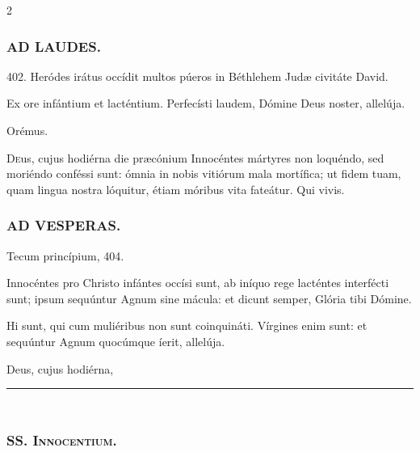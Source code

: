 \documentclass[9pt,twoside]{extarticle}
\begin{document}
\begin{multicols}{2}
\subsubsection*{\center \textsc{AD LAUDES.}}
\begin{tightlist}{}
\item {} 402.  Heródes irátus occídit multos púeros in Béthlehem Judæ civitáte David.
\item {} Ex ore infántium et lacténtium.  Perfecísti laudem, Dómine Deus noster, allelúja.
\item Orémus. \hfill {}
\end{tightlist}
\lettrine{D}eus, cujus hodiérna die præcónium Innocéntes mártyres non loquéndo, sed moriéndo conféssi sunt: ómnia in nobis vitiórum mala mortífica; ut fidem tuam, quam lingua nostra lóquitur, étiam móribus vita fateátur. Qui vivis.


\subsubsection*{\center \textsc{AD VESPERAS.}}
\begin{tightlist}{}
\item {} Tecum princípium,  404.
\item {} Innocéntes pro Christo infántes occísi sunt, ab iníquo rege lacténtes interfécti sunt; ipsum sequúntur Agnum sine mácula: et dicunt semper, Glória tibi Dómine.
\item {} Hi sunt, qui cum muliéribus non sunt coinquináti.  Vírgines enim sunt: et sequúntur Agnum quocúmque íerit, allelúja.
\item {} Deus, cujus hodiérna, 
\end{tightlist}

\begin{center}\textcolor{red}{\rule{\linewidth}{0.5pt}} \end{center}

\subsection*{\center {}}
\subsubsection*{\center {}\\ \textsc{SS. Innocentium.}}

\end{multicols}
\end{document}
